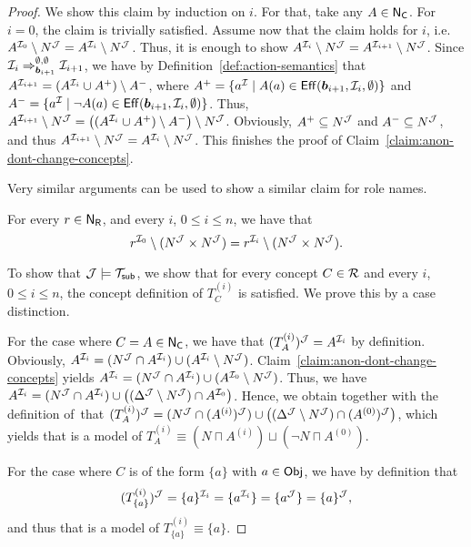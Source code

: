 \begin{proof}
    \noindent
    We show this claim by induction on $i$.  For that, take any $A\in\mathsf{N_C}$.  For
    $i=0$, the claim is trivially satisfied.  Assume now that the claim holds
    for $i$, i.e.~$A^{\mathcal{I}_0}\setminus N^\mathcal{J}=A^{\mathcal{I}_i}\setminus N^\mathcal{J}$.
    Thus, it is enough to show
    $A^{\mathcal{I}_i}\setminus N^\mathcal{J}=A^{\mathcal{I}_{i+1}}\setminus N^\mathcal{J}$.  Since
    $\mathcal{I}_i\Rightarrow_{\boldsymbol b_{i+1}}^{\emptyset,\emptyset}\mathcal{I}_{i+1}$, we have by
    Definition~\ref{def:action-semantics} that
    $A^{\mathcal{I}_{i+1}}=(A^{\mathcal{I}_i}\cup A^+)\setminus A^-$, where
    $A^+=\{a^\mathcal{I}\mid A(a)\in\operatorname{\mathsf{Eff}}(\boldsymbol b_{i+1},\mathcal{I}_i,\emptyset)\}$ and
    $A^-=\{a^\mathcal{I}\mid\lnot A(a)\in\operatorname{\mathsf{Eff}}(\boldsymbol b_{i+1},\mathcal{I}_i,\emptyset)\}$.  Thus,
    $A^{\mathcal{I}_{i+1}}\setminus N^\mathcal{J}=\bigl((A^{\mathcal{I}_i}\cup A^+)\setminus A^-\bigr)\setminus N^\mathcal{J}$.
    Obviously, $A^+\subseteq N^\mathcal{J}$ and $A^-\subseteq N^\mathcal{J}$, and thus
    $A^{\mathcal{I}_{i+1}}\setminus N^\mathcal{J}=A^{\mathcal{I}_i}\setminus N^\mathcal{J}$.
    This finishes the proof of Claim~\ref{claim:anon-dont-change-concepts}.

    Very similar arguments can be used to show a similar claim for role names.

    \begin{claim}\label{claim:anon-dont-change-roles}
        For every $r\in\mathsf{N_R}$, and every $i$, $0\le i\le n$, we have that
        \[r^{\Imc_0}\setminus(N^\Jmc\times N^\Jmc)%
            =r^{\Imc_i}\setminus(N^\Jmc\times N^\Jmc).\]
    \end{claim}

    \noindent
    To show that $\mathcal{J}\models\mathcal{T}_\mathsf{sub}$, we show that for every concept $C\in\mathcal{R}$
    and every $i$, $0\le i\le n$, the concept definition of $T_C^{(i)}$ is
    satisfied.  We prove this by a case distinction.

    For the case where $C=A\in\mathsf{N_C}$, we have that $(T_A^{(i)})^\mathcal{J}=A^{\mathcal{I}_i}$
    by definition.  Obviously,
    $A^{\mathcal{I}_i}=(N^\mathcal{J}\cap A^{\mathcal{I}_i})\cup(A^{\mathcal{I}_i}\setminus N^\mathcal{J})$.
    Claim~\ref{claim:anon-dont-change-concepts} yields
    $A^{\mathcal{I}_i}=(N^\mathcal{J}\cap A^{\mathcal{I}_i})\cup(A^{\mathcal{I}_0}\setminus N^\mathcal{J})$.  Thus,
    we have
    $A^{\mathcal{I}_i}=(N^\mathcal{J}\cap A^{\mathcal{I}_i})\cup\bigl((\Delta^\mathcal{J}\setminus N^\mathcal{J})\cap A^{\mathcal{I}_0}\bigr)$.
    Hence, we obtain together with the definition of~\Jmc that
    $(T_A^{(i)})^\mathcal{J}=(N^\mathcal{J}\cap(A^{(i)})^\mathcal{J})\cup\bigl((\Delta^\mathcal{J}\setminus N^\mathcal{J})\cap(A^{(0)})^\mathcal{J}\bigr)$,
    which yields that \Jmc is a model of
    $T_A^{(i)}\equiv(N\sqcap A^{(i)})\sqcup(\lnot N\sqcap A^{(0)})$.

    For the case where $C$ is of the form $\{a\}$ with $a\in\mathsf{Obj}$, we have by
    definition that
    \[(T_{\{a\}}^{(i)})^\Jmc%
        =\{a\}^{\Imc_i}%
        =\{a^{\Imc_i}\}%
        =\{a^\Jmc\}%
        =\{a\}^\Jmc,\]
    and thus that \Jmc is a model of $T_{\{a\}}^{(i)}\equiv\{a\}$.


\end{proof}
